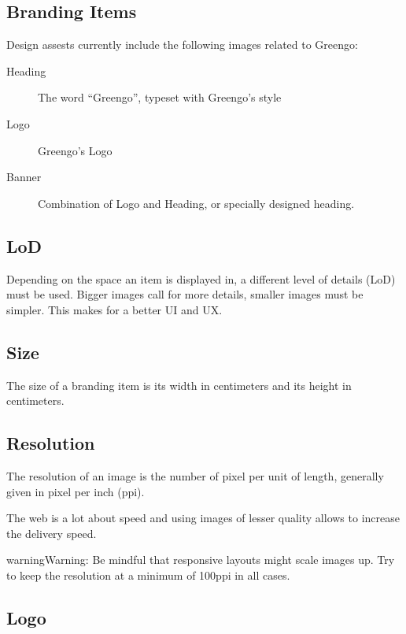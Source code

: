 \documentclass[letterpaper,10pt,english]{sphinxmanual}
\begin{document}
\subsection{Branding Items}
\label{\detokenize{design/design_assets:branding-items}}
Design assests currently include the following images related to Greengo:
\begin{description}
\item[{Heading}] \leavevmode
The word “Greengo”, typeset with Greengo’s style

\item[{Logo}] \leavevmode
Greengo’s Logo

\item[{Banner}] \leavevmode
Combination of Logo and Heading, or specially designed heading.

\end{description}


\subsection{LoD}
\label{\detokenize{design/design_assets:lod}}
Depending on the space an item is displayed in, a different level of details (LoD) must be used.
Bigger images call for more details, smaller images must be simpler.
This makes for a better UI and UX.


\subsection{Size}
\label{\detokenize{design/design_assets:size}}
The size of a branding item is its width in centimeters and its height in centimeters.


\subsection{Resolution}
\label{\detokenize{design/design_assets:resolution}}
The resolution of an image is the number of pixel per unit of length, generally given in pixel per inch (ppi).

The web is a lot about speed and using images of lesser quality allows to increase the delivery speed.

\begin{sphinxadmonition}{warning}{Warning:}
Be mindful that responsive layouts might scale images up. Try to keep the resolution at a minimum of 100ppi in all cases.
\end{sphinxadmonition}


\subsection{Logo}
\label{\detokenize{design/design_assets:logo}}
\begin{figure}[htbp]
\centering

\noindent{}
\end{figure}
\end{document}
